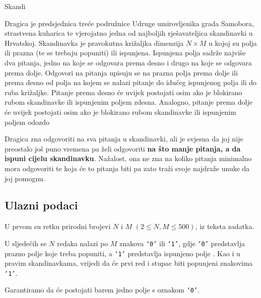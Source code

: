 \begin{statement}[
  problempoints=110,
  timelimit=10 sekundi,
  memorylimit=512 MiB,
]{Skandi}


Dragica je predsjednica treće podružnice Udruge umirovljenika grada Samobora,
strastvena kuharica te vjerojatno jedna od najboljih rješavateljica
skandinavki u Hrvatskoj. Skandinavka je pravokutna križaljka dimenzija $N
\times M$ u kojoj su polja ili prazna (te se trebaju popuniti) ili ispunjena.
Ispunjena polja sadrže najviše dva pitanja, jedno na koje se odgovara prema
desno i drugo na koje se odgovara prema dolje. Odgovori na pitanja upisuju se
na prazna polja prema dolje ili prema desno od polja na kojem se nalazi
pitanje do idućeg ispunjenog polja ili do ruba križaljke.  Pitanje prema
desno će uvijek postojati osim ako je blokirano rubom skandinavke ili
ispunjenim poljem zdesna. Analogno, pitanje prema dolje će uvijek postojati
osim ako je blokirano rubom skandinavke ili ispunjenim poljem odozdo

Dragica zna odgovoriti na sva pitanja u skandinavki, ali je svjesna da joj nije
preostalo još puno vremena pa želi odgovoriti \textbf{na što manje pitanja, a
da ispuni cijelu skandinavku}. Nažalost, ona ne zna na koliko pitanja
minimalno mora odgovoriti te koja će to pitanja biti pa zato traži svoje
najdraže unuke da joj pomognu.

\subsection*{Ulazni podaci}
U prvom su retku prirodni brojevi $N$ i $M$ $(2 \le N, M \le 500)$, iz teksta
zadatka.

U sljedećih se $N$ redaka nalazi po $M$ znakova \texttt{‘0’} ili
\texttt{‘1’}, gdje \texttt{‘0’} predstavlja prazno polje koje treba popuniti,
a \texttt{‘1’} predstavlja ispunjeno polje . Kao i u pravim skandinavkama,
vrijedi da će prvi red i stupac biti popunjeni znakovima \texttt{‘1’}.

Garantiramo da će postojati barem jedno polje s oznakom \texttt{‘0’}.


\end{statement}
